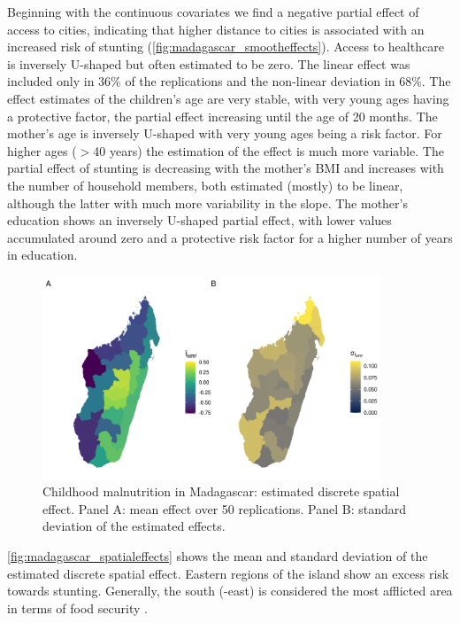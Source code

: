 Beginning with the continuous covariates we find a negative partial effect of access to cities, indicating that higher distance to cities is associated with an increased risk of stunting (\autoref{fig:madagascar_smootheffects}). Access to healthcare is inversely U-shaped but often estimated to be zero. The linear effect was included only in 36\% of the replications and the non-linear deviation in 68\%. The effect estimates of the children's age are very stable, with very young ages having a protective factor, the partial effect increasing until the age of 20 months. The mother's age is inversely U-shaped with very young ages being a risk factor. For higher ages ($>$40 years) the estimation of the effect is much more variable. The partial effect of stunting is decreasing with the mother's BMI and increases with the number of household members, both estimated (mostly) to be linear, although the latter with much more variability in the slope. The mother's education shows an inversely U-shaped partial effect, with lower values accumulated around zero and a protective risk factor for a higher number of years in education. 

\begin{figure}[!t]
	\centering
	\includegraphics[width=0.9\textwidth, keepaspectratio]{figures/madagascar_spatialeffects.png}
	\caption{Childhood malnutrition in Madagascar: estimated discrete spatial effect. Panel A: mean effect over 50 replications. Panel B: standard deviation of the estimated effects.}
	\label{fig:madagascar_spatialeffects}
\end{figure}

\autoref{fig:madagascar_spatialeffects} shows the mean and standard deviation of the estimated discrete spatial effect. Eastern regions of the island show an excess risk towards stunting. Generally, the south (-east) is considered the most afflicted area in terms of food security \autocite{fewsnetFEWSNETData2022}.

